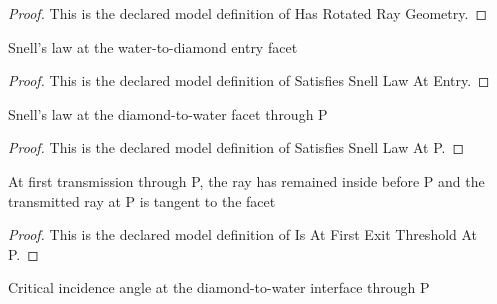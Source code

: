 \begin{proof}
  This is the declared model definition of Has Rotated Ray Geometry.
\end{proof}
\begin{definition}
  \label{def:physics:phyx-mini-0011:phyxminiproblems-problemphyxmini0011-satisfiessnelllawatentry}
  Snell's law at the water-to-diamond entry facet
\end{definition}
\begin{proof}
  This is the declared model definition of Satisfies Snell Law At Entry.
\end{proof}
\begin{definition}
  \label{def:physics:phyx-mini-0011:phyxminiproblems-problemphyxmini0011-satisfiessnelllawatp}
  Snell's law at the diamond-to-water facet through P
\end{definition}
\begin{proof}
  This is the declared model definition of Satisfies Snell Law At P.
\end{proof}
\begin{definition}
  \label{def:physics:phyx-mini-0011:phyxminiproblems-problemphyxmini0011-isatfirstexitthresholdatp}
  At first transmission through P, the ray has remained inside before P and the transmitted ray at P is tangent to the facet
\end{definition}
\begin{proof}
  This is the declared model definition of Is At First Exit Threshold At P.
\end{proof}
\begin{definition}
  \label{def:physics:phyx-mini-0011:phyxminiproblems-problemphyxmini0011-criticalangleatpradians}
  Critical incidence angle at the diamond-to-water interface through P
\end{definition}
